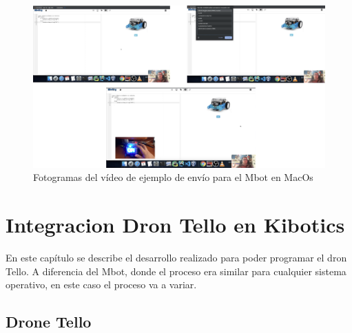 \documentclass{report}
\begin{document}
\begin{figure}[h!]
  \centering
    \includegraphics[width=1\textwidth]{images/fotogramas_mbot.png}
  \caption{Fotogramas del vídeo de ejemplo de envío para el Mbot en MacOs}
  \label{Fotogramas del vídeo de ejemplo de envío para el Mbot en MacOs}
\end{figure}








\chapter{Integracion Dron Tello en Kibotics}

En este capítulo se describe el desarrollo realizado para poder programar el dron Tello. A diferencia del Mbot, donde el proceso era similar para cualquier sistema operativo, en este caso el proceso va a variar.

\section{Drone Tello}
\end{document}
